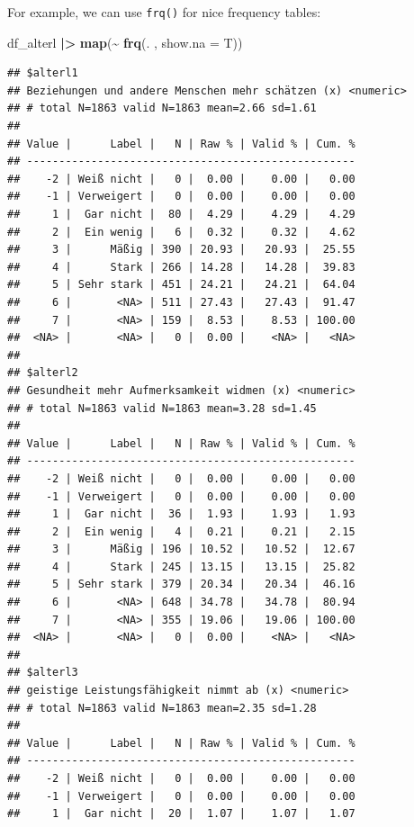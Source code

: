 \documentclass[
  doc]{apa6}
\newenvironment{Shaded}{\begin{snugshade}}{\end{snugshade}}
\newcommand{\AttributeTok}[1]{\textcolor[rgb]{0.13,0.29,0.53}{#1}}
\newcommand{\FunctionTok}[1]{\textcolor[rgb]{0.13,0.29,0.53}{\textbf{#1}}}
\newcommand{\NormalTok}[1]{#1}
\newcommand{\SpecialCharTok}[1]{\textcolor[rgb]{0.81,0.36,0.00}{\textbf{#1}}}
\begin{document}
For example, we can use \texttt{frq()} for nice frequency tables:

\begin{Shaded}
\begin{Highlighting}[]
\NormalTok{df\_alterl }\SpecialCharTok{|\textgreater{}} 
  \FunctionTok{map}\NormalTok{(}\SpecialCharTok{\textasciitilde{}} \FunctionTok{frq}\NormalTok{(. , }\AttributeTok{show.na =}\NormalTok{ T))}
\end{Highlighting}
\end{Shaded}

\begin{verbatim}
## $alterl1
## Beziehungen und andere Menschen mehr schätzen (x) <numeric> 
## # total N=1863 valid N=1863 mean=2.66 sd=1.61
## 
## Value |      Label |   N | Raw % | Valid % | Cum. %
## ---------------------------------------------------
##    -2 | Weiß nicht |   0 |  0.00 |    0.00 |   0.00
##    -1 | Verweigert |   0 |  0.00 |    0.00 |   0.00
##     1 |  Gar nicht |  80 |  4.29 |    4.29 |   4.29
##     2 |  Ein wenig |   6 |  0.32 |    0.32 |   4.62
##     3 |      Mäßig | 390 | 20.93 |   20.93 |  25.55
##     4 |      Stark | 266 | 14.28 |   14.28 |  39.83
##     5 | Sehr stark | 451 | 24.21 |   24.21 |  64.04
##     6 |       <NA> | 511 | 27.43 |   27.43 |  91.47
##     7 |       <NA> | 159 |  8.53 |    8.53 | 100.00
##  <NA> |       <NA> |   0 |  0.00 |    <NA> |   <NA>
## 
## $alterl2
## Gesundheit mehr Aufmerksamkeit widmen (x) <numeric> 
## # total N=1863 valid N=1863 mean=3.28 sd=1.45
## 
## Value |      Label |   N | Raw % | Valid % | Cum. %
## ---------------------------------------------------
##    -2 | Weiß nicht |   0 |  0.00 |    0.00 |   0.00
##    -1 | Verweigert |   0 |  0.00 |    0.00 |   0.00
##     1 |  Gar nicht |  36 |  1.93 |    1.93 |   1.93
##     2 |  Ein wenig |   4 |  0.21 |    0.21 |   2.15
##     3 |      Mäßig | 196 | 10.52 |   10.52 |  12.67
##     4 |      Stark | 245 | 13.15 |   13.15 |  25.82
##     5 | Sehr stark | 379 | 20.34 |   20.34 |  46.16
##     6 |       <NA> | 648 | 34.78 |   34.78 |  80.94
##     7 |       <NA> | 355 | 19.06 |   19.06 | 100.00
##  <NA> |       <NA> |   0 |  0.00 |    <NA> |   <NA>
## 
## $alterl3
## geistige Leistungsfähigkeit nimmt ab (x) <numeric> 
## # total N=1863 valid N=1863 mean=2.35 sd=1.28
## 
## Value |      Label |   N | Raw % | Valid % | Cum. %
## ---------------------------------------------------
##    -2 | Weiß nicht |   0 |  0.00 |    0.00 |   0.00
##    -1 | Verweigert |   0 |  0.00 |    0.00 |   0.00
##     1 |  Gar nicht |  20 |  1.07 |    1.07 |   1.07

\end{verbatim}
\end{document}
